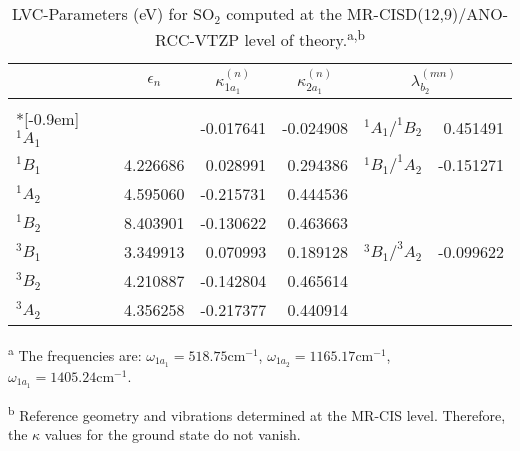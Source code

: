 \documentclass[journal=jpclcd,manuscript=article
]{achemso}
\begin{document}
 \begin{table*}
 \label{tab:LVCD}
 \caption{LVC-Parameters (eV) for SO$_2$ computed at the MR-CISD(12,9)/ANO-RCC-VTZP level of theory.\textsuperscript{a,b}}
 \begin{tabular}{lrrr|rr}
 \hline
  & \multicolumn{1}{c}{$\epsilon_n$} & \multicolumn{1}{c}{$\kappa_{1a_1}^{(n)}$} & \multicolumn{1}{c}{$\kappa_{2a_1}^{(n)}$} & \multicolumn{2}{|c}{$\lambda_{b_2}^{(mn)}$} \\
 \hline
 &&&&& \\*[-0.9em]
$^1A_1$ &  & -0.017641 & -0.024908 & $^1A_1/^1B_2$ & 0.451491 \\ 
$^1B_1$ & 4.226686 & 0.028991 & 0.294386 & $^1B_1/^1A_2$ & -0.151271 \\ 
$^1A_2$ & 4.595060 & -0.215731 & 0.444536 &  &  \\ 
$^1B_2$ & 8.403901 & -0.130622 & 0.463663 &  &  \\ 
$^3B_1$ & 3.349913 & 0.070993 & 0.189128 & $^3B_1/^3A_2$ & -0.099622 \\ 
$^3B_2$ & 4.210887 & -0.142804 & 0.465614 &  &  \\ 
$^3A_2$ & 4.356258 & -0.217377 & 0.440914 &  &  \\ 
 \hline
 \end{tabular}
 
 \vspace{0.5em}
 \textsuperscript{a} The frequencies are: $\omega_{1a_1}=518.75\mathrm{cm}^{-1}$, $\omega_{1a_2}=1165.17\mathrm{cm}^{-1}$, $\omega_{1a_1}=1405.24\mathrm{cm}^{-1}$.
 
 \textsuperscript{b} Reference geometry and vibrations determined at the MR-CIS level. Therefore, the $\kappa$ values for the ground state do not vanish.
 \end{table*}

\end{document}
